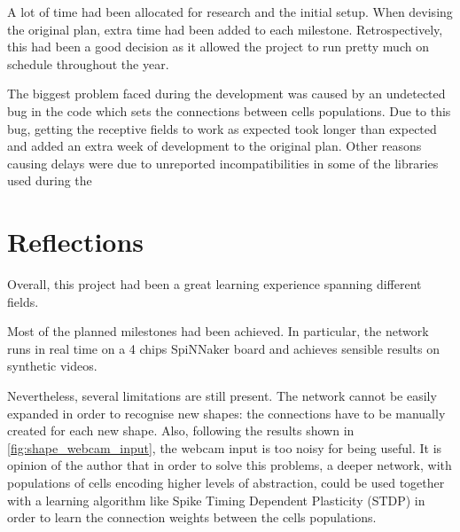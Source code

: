 A lot of time had been allocated for research and the initial setup. When devising the original plan, extra time had been added to each milestone. Retrospectively, this had been a good decision as it allowed the project to run pretty much on schedule throughout the year.

The biggest problem faced during the development was caused by an undetected bug in the code which sets the connections between cells populations. Due to this bug, getting the receptive fields to work as expected took longer than expected and added an extra week of development to the original plan. Other reasons causing delays were due to unreported incompatibilities in some of the libraries used during the 

\section{Reflections}
Overall, this project had been a great learning experience spanning different fields. 

Most of the planned milestones had been achieved. In particular, the network runs in real time on a 4 chips SpiNNaker board and achieves sensible results on synthetic videos.

Nevertheless, several limitations are still present. The network cannot be easily expanded in order to recognise new shapes: the connections have to be manually created for each new shape. Also, following the results shown in \cref{fig:shape_webcam_input}, the webcam input is too noisy for being useful. It is opinion of the author that in order to solve this problems, a deeper network, with populations of cells encoding higher levels of abstraction, could be used together with a learning algorithm like Spike Timing Dependent Plasticity (STDP) \cite{Song2000} in order to learn the connection weights between the cells populations. 